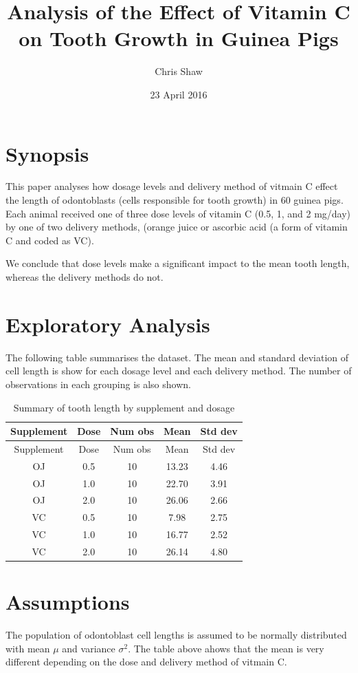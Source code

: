 \documentclass[]{article}
\title{Analysis of the Effect of Vitamin C on Tooth Growth in Guinea Pigs}
\author{Chris Shaw}
\date{23 April 2016}
\begin{document}
\maketitle

\section{Synopsis}\label{synopsis}

This paper analyses how dosage levels and delivery method of vitmain C
effect the length of odontoblasts (cells responsible for tooth growth)
in 60 guinea pigs. Each animal received one of three dose levels of
vitamin C (0.5, 1, and 2 mg/day) by one of two delivery methods, (orange
juice or ascorbic acid (a form of vitamin C and coded as VC).

We conclude that dose levels make a significant impact to the mean tooth
length, whereas the delivery methods do not.

\section{Exploratory Analysis}\label{exploratory-analysis}

The following table summarises the dataset. The mean and standard
deviation of cell length is show for each dosage level and each delivery
method. The number of observations in each grouping is also shown.

\begin{longtable}[c]{@{}ccccc@{}}
\caption{Summary of tooth length by supplement and
dosage}\tabularnewline
\toprule
Supplement & Dose & Num obs & Mean & Std dev\tabularnewline
\midrule
\endfirsthead
\toprule
Supplement & Dose & Num obs & Mean & Std dev\tabularnewline
\midrule
\endhead
OJ & 0.5 & 10 & 13.23 & 4.46\tabularnewline
OJ & 1.0 & 10 & 22.70 & 3.91\tabularnewline
OJ & 2.0 & 10 & 26.06 & 2.66\tabularnewline
VC & 0.5 & 10 & 7.98 & 2.75\tabularnewline
VC & 1.0 & 10 & 16.77 & 2.52\tabularnewline
VC & 2.0 & 10 & 26.14 & 4.80\tabularnewline
\bottomrule
\end{longtable}

\section{Assumptions}\label{assumptions}

The population of odontoblast cell lengths is assumed to be normally
distributed with mean \(\mu\) and variance \(\sigma^2\). The table above
ahows that the mean is very different depending on the dose and delivery
method of vitmain C.
\end{document}
